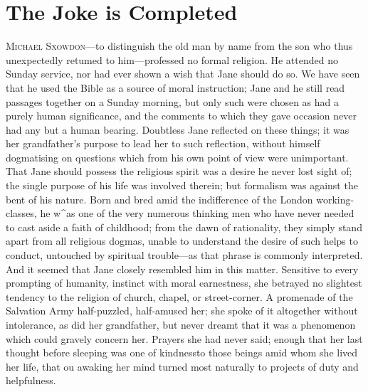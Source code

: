 \chapter{The Joke is Completed}

\textsc{Michael Sxowdon}---to distinguish the old man by name from the
son who thus unexpectedly retumed to him---professed no formal religion.
He attended no Sunday service, nor had ever shown a wish that Jane
should do so. We have seen that he used the Bible as a source of moral
instruction; Jane and he still read passages together on a Sunday
morning, but only such were chosen as had a purely human significance,
and the comments to which they gave occasion never had any but a human
bearing. Doubtless Jane reflected on these things; it was her
grandfather's purpose to lead her to such reflection, without himself
dogmatising on questions which from his own point of view were
unimportant. That Jane should possess the
{\protect\hypertarget{79}{}{}}religious spirit was a desire he never
lost sight of; the single purpose of his life was involved therein; but
formalism was against the bent of his nature. Born and bred amid the
indifference of the London working-classes, he w\^{}as one of the very
numerous thinking men who have never needed to cast aside a faith of
childhood; from the dawn of rationality, they simply stand apart from
all religious dogmas, unable to understand the desire of such helps to
conduct, untouched by spiritual trouble---as that phrase is commonly
interpreted. And it seemed that Jane closely resembled him in this
matter. Sensitive to every prompting of humanity, instinct with moral
earnestness, she betrayed no slightest tendency to the religion of
church, chapel, or street-corner. A promenade of the Salvation Army
half-puzzled, half-amused her; she spoke of it altogether without
intolerance, as did her grandfather, but never dreamt that it was a
phenomenon which could gravely concern her. Prayers she had never said;
enough that her last thought before sleeping was one of
{\protect\hypertarget{80}{}{}}kindnessto those beings amid whom she
lived her life, that ou awaking her mind turned most naturally to
projects of duty and helpfulness.

